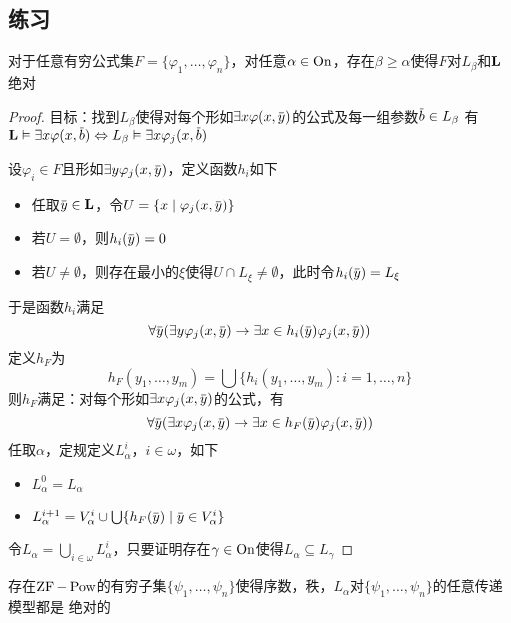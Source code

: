 \documentclass[11pt]{article}
\begin{document}
\subsection{练习}
\label{sec:orge85458a}
\begin{lemma}[\(\bL\)的反映定理]
对于任意有穷公式集\(F=\{\varphi_1,\dots,\varphi_n\}\)，对任意\(\alpha\in\operatorname{On}\)，存在\(\beta\ge\alpha\)使得\(F\)对\(L_\beta\)和\(\bL\)绝对
\end{lemma}

\begin{proof}
目标：找到\(L_\beta\)使得对每个形如\(\exists x\varphi(x,\bary)\)的公式及每一组参数\(\barb\in L_\beta\)
有\(\bL\vDash\exists x\varphi(x,\barb)\Leftrightarrow L_\beta\vDash\exists x\varphi_j(x,\barb)\)

设\(\varphi_i\in F\)且形如\(\exists y\varphi_j(x,\bary)\)，定义函数\(h_i\)如下
\begin{itemize}
\item 任取\(\bary\in \bL\)，令\(U=\{x\mid\varphi_j(x,\bary)\}\)
\item 若\(U=\emptyset\)，则\(h_i(\bary)=0\)
\item 若\(U\neq\emptyset\)，则存在最小的\(\xi\)使得\(U\cap L_\xi\neq\emptyset\)，此时令\(h_i(\bary)=L_\xi\)
\end{itemize}
于是函数\(h_i\)满足
\begin{equation*}
\forall\bary(\exists y\varphi_j(x,\bary)\to\exists x\in h_i(\bary)\varphi_j(x,\bary))
\end{equation*}
定义\(h_F\)为
\begin{equation*}
h_F(y_1,\dots,y_m)=\bigcup\{h_i(y_1,\dots,y_m):i=1,\dots,n\}
\end{equation*}
则\(h_F\)满足：对每个形如\(\exists x\varphi_j(x,\bary)\)的公式，有
\begin{equation*}
\forall\bary(\exists x\varphi_j(x,\bary)\to\exists x\in h_F(\bary)\varphi_j(x,\bary))
\end{equation*}
任取\(\alpha\)，定规定义\(L_\alpha^i\)，\(i\in\omega\)，如下
\begin{itemize}
\item \(L_\alpha^0=L_\alpha\)
\item \(L_\alpha^{i+1}=V_\alpha^i\cup\bigcup\{h_F(\bary)\mid\bary\in V_\alpha^i\}\)
\end{itemize}
令\(L_\alpha=\bigcup_{i\in\omega}L_\alpha^i\)，只要证明存在\(\gamma\in\operatorname{On}\)使得\(L_\alpha\subseteq L_\gamma\)
\end{proof}

\begin{lemma}[ZF]
存在\(\operatorname{ZF}-\operatorname{Pow}\)的有穷子集\(\{\psi_1,\dots,\psi_n\}\)使得序数，秩，\(L_\alpha\)对\(\{\psi_1,\dots,\psi_n\}\)的任意传递模型都是
绝对的
\end{lemma}
\end{document}
